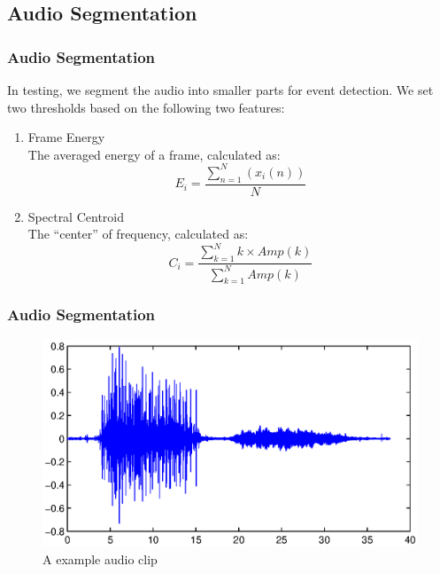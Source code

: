 \documentclass[xcolor=table,slidestop,compress,mathserif]{beamer}
\begin{document}
\subsection{Audio Segmentation}
\begin{frame}
	\frametitle{Audio Segmentation}	
	In testing, we segment the audio into smaller parts for event detection. 
	We set two thresholds based on the following two features: 
	\begin{enumerate}
		\item{Frame Energy} \\ 
		The averaged energy of a frame, calculated as: 
		\begin{equation}
		E_i = \frac{\sum\limits_{n=1}^N(x_i(n))}{N}
		\end{equation}
		\item{Spectral Centroid} \\ 
		The ``center'' of frequency, calculated as: 
		\begin{equation}
		C_i = \frac{\sum\limits_{k=1}^Nk\times Amp(k)}{\sum\limits_{k=1}^NAmp(k)}
		\end{equation}
	\end{enumerate}
\end{frame}
\begin{frame}
	\frametitle{Audio Segmentation}
	\begin{figure}
	\includegraphics[scale=0.5]{figure/tune_part.eps}
	\caption{A example audio clip}
	\end{figure}
\end{frame}
\end{document}
